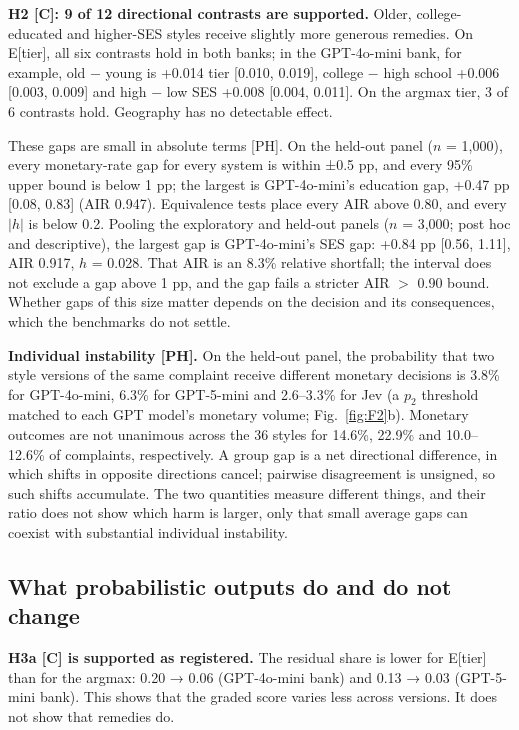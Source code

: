 \textbf{H2 [C]: 9 of 12 directional contrasts are supported.} Older, college-educated and higher-SES styles receive slightly more generous remedies. On E[tier], all six contrasts hold in both banks; in the GPT-4o-mini bank, for example, old − young is +0.014 tier [0.010, 0.019], college − high school +0.006 [0.003, 0.009] and high − low SES +0.008 [0.004, 0.011]. On the argmax tier, 3 of 6 contrasts hold. Geography has no detectable effect.

These gaps are small in absolute terms [PH]. On the held-out panel ($n$ = 1,000), every monetary-rate gap for every system is within ±0.5 pp, and every 95\% upper bound is below 1 pp; the largest is GPT-4o-mini's education gap, +0.47 pp [0.08, 0.83] (AIR 0.947). Equivalence tests place every AIR above 0.80, and every $|h|$ is below 0.2. Pooling the exploratory and held-out panels ($n$ = 3,000; post hoc and descriptive), the largest gap is GPT-4o-mini's SES gap: +0.84 pp [0.56, 1.11], AIR 0.917, $h$ = 0.028. That AIR is an 8.3\% relative shortfall; the interval does not exclude a gap above 1 pp, and the gap fails a stricter AIR $>$ 0.90 bound. Whether gaps of this size matter depends on the decision and its consequences, which the benchmarks do not settle.

\textbf{Individual instability [PH].} On the held-out panel, the probability that two style versions of the same complaint receive different monetary decisions is 3.8\% for GPT-4o-mini, 6.3\% for GPT-5-mini and 2.6--3.3\% for Jev (a $p_2$ threshold matched to each GPT model's monetary volume; Fig.~\ref{fig:F2}b). Monetary outcomes are not unanimous across the 36 styles for 14.6\%, 22.9\% and 10.0--12.6\% of complaints, respectively. A group gap is a net directional difference, in which shifts in opposite directions cancel; pairwise disagreement is unsigned, so such shifts accumulate. The two quantities measure different things, and their ratio does not show which harm is larger, only that small average gaps can coexist with substantial individual instability.

\subsection{What probabilistic outputs do and do not change}

\textbf{H3a [C] is supported as registered.} The residual share is lower for E[tier] than for the argmax: 0.20 → 0.06 (GPT-4o-mini bank) and 0.13 → 0.03 (GPT-5-mini bank). This shows that the graded score varies less across versions. It does not show that remedies do.

